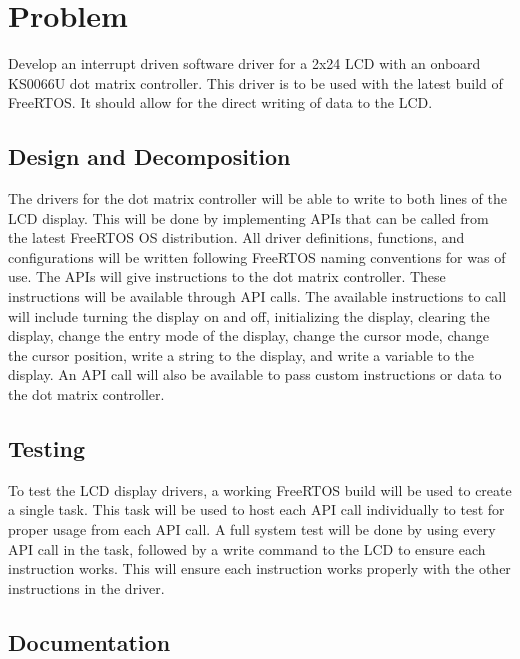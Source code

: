 \hypertarget{index_problem}{}\section{Problem}\label{index_problem}
Develop an interrupt driven software driver for a 2x24 L\-C\-D with an onboard K\-S0066\-U dot matrix controller. This driver is to be used with the latest build of Free\-R\-T\-O\-S. It should allow for the direct writing of data to the L\-C\-D.\hypertarget{index_design}{}\subsection{Design and Decomposition}\label{index_design}
The drivers for the dot matrix controller will be able to write to both lines of the L\-C\-D display. This will be done by implementing A\-P\-Is that can be called from the latest Free\-R\-T\-O\-S O\-S distribution. All driver definitions, functions, and configurations will be written following Free\-R\-T\-O\-S naming conventions for was of use. The A\-P\-Is will give instructions to the dot matrix controller. These instructions will be available through A\-P\-I calls. The available instructions to call will include turning the display on and off, initializing the display, clearing the display, change the entry mode of the display, change the cursor mode, change the cursor position, write a string to the display, and write a variable to the display. An A\-P\-I call will also be available to pass custom instructions or data to the dot matrix controller.\hypertarget{index_testing}{}\subsection{Testing}\label{index_testing}
To test the L\-C\-D display drivers, a working Free\-R\-T\-O\-S build will be used to create a single task. This task will be used to host each A\-P\-I call individually to test for proper usage from each A\-P\-I call. A full system test will be done by using every A\-P\-I call in the task, followed by a write command to the L\-C\-D to ensure each instruction works. This will ensure each instruction works properly with the other instructions in the driver.\hypertarget{index_documentation}{}\subsection{Documentation}\label{index_documentation}
